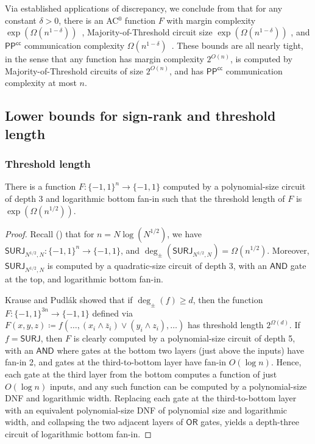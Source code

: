 \documentclass{toc}
\newcommand{\SURJ}{\mathsf{ SURJ}}
\newcommand{\OR}{\mathsf{ OR}}
\newcommand{\bits}{\{-1,1\}}
\newcommand{\AND}{\mathsf{AND}}
\begin{document}
Via established applications of discrepancy, we conclude from 
that for any constant $\delta > 0$, there is an AC$^0$ function $F$ with margin complexity $\exp(\Omega(n^{1-\delta}))$~\cite{linial2009learning}, 
Majority-of-Threshold circuit size $\exp(\Omega(n^{1-\delta}))$ \cite{nisan, sherstovmajmaj}, and  $\mathsf{PP}^{\mathsf{cc}}$
communication complexity $\Omega(n^{1-\delta})$~\cite{klauck2001lower}. These bounds are all nearly tight, in the sense
that any function has margin complexity $2^{O(n)}$, is computed by Majority-of-Threshold circuits of size $2^{O(n)}$, 
and has $\mathsf{PP}^{\mathsf{cc}}$ communication complexity at most $n$.

\subsection{Lower bounds for sign-rank and threshold length}
\subsubsection{Threshold length}
\begin{theorem}
There is a function $F \colon \bits^n \to \bits$ computed by a 
polynomial-size  %
circuit of depth 3 and logarithmic bottom fan-in
	such that the threshold 
	length of $F$ is $\exp(\Omega(n^{1/2}))$. 
\end{theorem}
\begin{proof}
Recall () that for $n=N \log(N^{1/2})$, 
we have  %
$\SURJ_{N^{1/2}, N} \colon \bits^n \to \bits$, and 
$\deg_{\pm}(\SURJ_{N^{1/2}, N}) = \Omega(n^{1/2})$. 
Moreover, $\SURJ_{N^{1/2}, N}$ is computed by a 
quadratic-size %
circuit of depth 3, with an $\AND$ gate at the top, 
	and logarithmic bottom fan-in.
	
	Krause and Pudl{\'{a}}k showed that if $\deg_{\pm}(f) \geq d$, then the function $F \colon \bits^{3n} \to \bits$ defined
	via $F(x, y, z) \coloneqq  f(\dots, (x_i \wedge \overline{z}_i )\vee  (y_i \wedge z_i), \dots )$
	has threshold length $2^{\Omega(d)}$. 
	If $f=\SURJ$, then $F$ is clearly computed by a 
polynomial-size %
circuit of depth 5, with an $\AND$ where 
	gates at the bottom two layers (just above the inputs) have fan-in 2, and gates at the third-to-bottom layer have fan-in 
	$O(\log n)$. Hence, each gate at the third layer from the bottom computes a function of just $O(\log n)$
	inputs, and any such function can be computed by a 
polynomial-size %
DNF and logarithmic width. Replacing each gate at the third-to-bottom
layer with an equivalent polynomial-size %
DNF of polynomial size and logarithmic width, and collapsing the two adjacent layers of $\OR$
gates, yields a depth-three %
circuit of logarithmic bottom  fan-in.
\end{proof}
\end{document}

